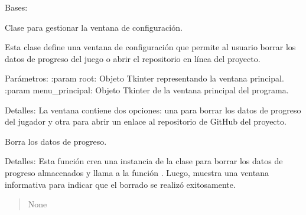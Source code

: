 \documentclass[letterpaper,10pt,spanish]{sphinxmanual}
\begin{document}
\begin{fulllineitems}
\label{\detokenize{configuracion:configuracion.Configuracion}}
\pysigstartsignatures
{}
\pysigstopsignatures
\sphinxAtStartPar
Bases: 

\sphinxAtStartPar
Clase para gestionar la ventana de configuración.

\sphinxAtStartPar
Esta clase define una ventana de configuración que permite al usuario borrar
los datos de progreso del juego o abrir el repositorio en línea del proyecto.

\sphinxAtStartPar
Parámetros:
:param root: Objeto Tkinter representando la ventana principal.
:param menu\_principal: Objeto Tkinter de la ventana principal del programa.

\sphinxAtStartPar
Detalles:
La ventana contiene dos opciones: una para borrar los datos de progreso del jugador
y otra para abrir un enlace al repositorio de GitHub del proyecto.

\begin{fulllineitems}
\label{\detokenize{configuracion:configuracion.Configuracion.borrar_progreso}}
\pysigstartsignatures
{}
\pysigstopsignatures
\sphinxAtStartPar
Borra los datos de progreso.

\sphinxAtStartPar
Detalles: Esta función crea una instancia de la clase  para borrar los datos de progreso
almacenados y llama a la función . Luego, muestra una ventana informativa para indicar que el
borrado se realizó exitosamente.
\begin{quote}\begin{description}
\sphinxAtStartPar
None

\end{description}\end{quote}

\end{fulllineitems}


\end{fulllineitems}
\end{document}
